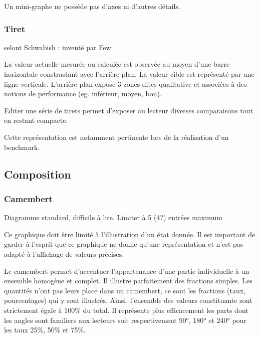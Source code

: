 \documentclass[a4paper,12pt]{article}
\begin{document}
\begin{multicols}{2}
Un mini-graphe ne possède pas d'axes ni d'autres détails.
\subsubsection*{Tiret}
\label{sec:org76bd7e9}
selont Schwabish : inventé par Few

La valeur actuelle mesurée ou calculée est observée au moyen d'une barre horizontale constrastant avec l'arrière plan. \autocite{jonathanschwabishComparingCategories2021}
La valeur cible est représenté par une ligne verticale. \autocite{alansmithLexiqueVisuel}
L'arrière plan expose 3 zones dites qualitative et associées à des notions de performance (eg. inférieur, moyen, bon). \autocite{sosulskiGraphics2019}

Editer une série de tirets permet d'exposer au lecteur diverses comparaisons tout en restant compacte. \autocite{jonathanschwabishComparingCategories2021}

Cette représentation est notamment pertinente lors de la réalisation d'un benchmark. \autocite{mikeyiHowChooseRight2020}
\subsection*{Composition}
\label{sec:orgbce736d}

\subsubsection*{Camembert}
\label{sec:org0fecd7e}
Diagramme standard, difficile à lire. \autocite{alansmithLexiqueVisuel}
Limiter à 5 (4?) entrées maximum \autocite{mikeyiHowChooseRight2020}

Ce graphique doit être limité à l'illustration d'un état donnée. Il est important de garder à l'esprit que ce graphique ne donne qu'une représentation et n'est pas adapté à l'affichage de valeurs précises. \autocite{jonathanschwabishParttowhole2021}

Le camembert permet d'accentuer l'appartenance d'une partie individuelle à un ensemble homogène et complet. Il illustre parfaitement des fractions simples.\autocite{wilkeDirectoryVisualizations2019} Les quantités n'ont pas leurs place dans un camembert, ce sont les fractions (taux, pourcentages) qui y sont illustrés. Ainsi, l'ensemble des valeurs constituante sont strictement égale à 100\% du total.\autocite{wilkeVisualizingAmounts2019} Il représente plus efficacement les parts dont les angles sont familiers aux lecteurs soit respectivement 90°, 180° et 240° pour les taux 25\%, 50\% et 75\%.


\end{multicols}
\end{document}
